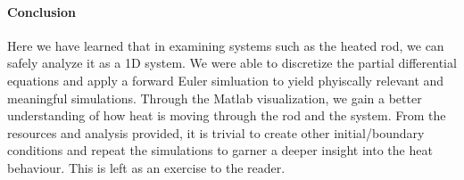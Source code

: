  \paragraph{Conclusion}
Here we have learned that in examining systems such as the heated rod, we can safely analyze it as a 1D system. We were able to discretize the partial differential equations and 
apply a forward Euler simluation to yield phyiscally relevant and meaningful simulations. Through the Matlab visualization, we gain a better understanding of how heat is moving 
through the rod and the system. From the resources and analysis provided, it is trivial to create other initial/boundary conditions and repeat the simulations to garner a deeper
insight into the heat behaviour. This is left as an exercise to the reader. 
 
